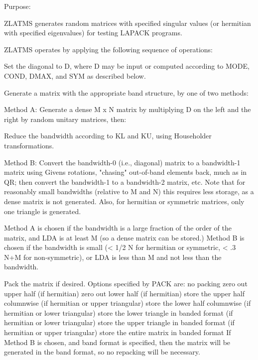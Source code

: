 \begin{DoxyParagraph}{Purpose\+: }
\begin{DoxyVerb}    ZLATMS generates random matrices with specified singular values
    (or hermitian with specified eigenvalues)
    for testing LAPACK programs.

    ZLATMS operates by applying the following sequence of
    operations:

      Set the diagonal to D, where D may be input or
         computed according to MODE, COND, DMAX, and SYM
         as described below.

      Generate a matrix with the appropriate band structure, by one
         of two methods:

      Method A:
          Generate a dense M x N matrix by multiplying D on the left
              and the right by random unitary matrices, then:

          Reduce the bandwidth according to KL and KU, using
              Householder transformations.

      Method B:
          Convert the bandwidth-0 (i.e., diagonal) matrix to a
              bandwidth-1 matrix using Givens rotations, "chasing"
              out-of-band elements back, much as in QR; then convert
              the bandwidth-1 to a bandwidth-2 matrix, etc.  Note
              that for reasonably small bandwidths (relative to M and
              N) this requires less storage, as a dense matrix is not
              generated.  Also, for hermitian or symmetric matrices,
              only one triangle is generated.

      Method A is chosen if the bandwidth is a large fraction of the
          order of the matrix, and LDA is at least M (so a dense
          matrix can be stored.)  Method B is chosen if the bandwidth
          is small (< 1/2 N for hermitian or symmetric, < .3 N+M for
          non-symmetric), or LDA is less than M and not less than the
          bandwidth.

      Pack the matrix if desired. Options specified by PACK are:
         no packing
         zero out upper half (if hermitian)
         zero out lower half (if hermitian)
         store the upper half columnwise (if hermitian or upper
               triangular)
         store the lower half columnwise (if hermitian or lower
               triangular)
         store the lower triangle in banded format (if hermitian or
               lower triangular)
         store the upper triangle in banded format (if hermitian or
               upper triangular)
         store the entire matrix in banded format
      If Method B is chosen, and band format is specified, then the
         matrix will be generated in the band format, so no repacking
         will be necessary.\end{DoxyVerb}
 
\end{DoxyParagraph}

